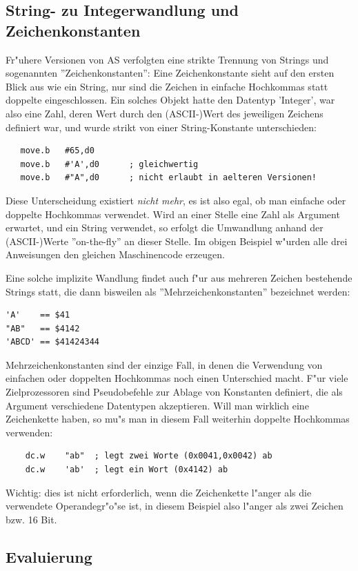 \documentclass[12pt,a4paper,twoside]{report}
\newcommand{\asname}{AS}
\begin{document}
\subsection{String- zu Integerwandlung und Zeichenkonstanten}

Fr"uhere Versionen von \asname{} verfolgten eine strikte Trennung von Strings
und sogenannten ''Zeichenkonstanten'': Eine Zeichenkonstante sieht
auf den ersten Blick aus wie ein String, nur sind die Zeichen in 
einfache Hochkommas statt doppelte eingeschlossen.  Ein solches
Objekt hatte den Datentyp 'Integer', war also eine Zahl, deren Wert
durch den (ASCII-)Wert des jeweiligen Zeichens definiert war, und wurde
strikt von einer String-Konstante unterschieden:

\begin{verbatim}
   move.b   #65,d0
   move.b   #'A',d0      ; gleichwertig
   move.b   #"A",d0      ; nicht erlaubt in aelteren Versionen!
\end{verbatim}

Diese Unterscheidung existiert {\em nicht mehr}, es ist also egal, ob
man einfache oder doppelte Hochkommas verwendet.  Wird an einer Stelle eine
Zahl als Argument erwartet, und ein String verwendet, so erfolgt die
Umwandlung anhand der (ASCII-)Werte ''on-the-fly'' an dieser Stelle.  Im
obigen Beispiel w"urden alle drei Anweisungen den gleichen Maschinencode
erzeugen.

Eine solche implizite Wandlung findet auch f"ur aus mehreren Zeichen
bestehende Strings statt, die dann bisweilen als ''Mehrzeichenkonstanten''
bezeichnet werden:
\begin{verbatim}
'A'    == $41
"AB"   == $4142
'ABCD' == $41424344
\end{verbatim}
Mehrzeichenkonstanten sind der einzige Fall, in denen die Verwendung von
einfachen oder doppelten Hochkommas noch einen Unterschied macht.  F"ur
viele Zielprozessoren sind Pseudobefehle zur Ablage von Konstanten definiert,
die als Argument verschiedene Datentypen akzeptieren.  Will man wirklich
eine Zeichenkette haben, so mu"s man in diesem Fall weiterhin doppelte
Hochkommas verwenden:
\begin{verbatim}
    dc.w    "ab"  ; legt zwei Worte (0x0041,0x0042) ab
    dc.w    'ab'  ; legt ein Wort (0x4142) ab
\end{verbatim}
Wichtig: dies ist nicht erforderlich, wenn die Zeichenkette l"anger als die
verwendete Operandegr"o"se ist, in diesem Beispiel also l"anger als zwei
Zeichen bzw. 16 Bit.

\subsection{Evaluierung}
\end{document}
